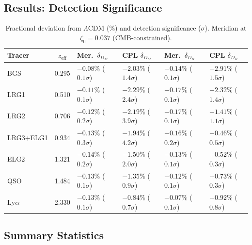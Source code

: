 \subsection{Results: Detection Significance}
\label{sec:2-DESI-sig}

\begin{table}[htbp]
\centering
\caption{Fractional deviation from $\Lambda$CDM (\%) and detection significance ($\sigma$). Meridian at $\zeta_0 = 0.037$ (CMB-constrained).}
\label{tab:2-deviations}
\footnotesize
\begin{tabular}{lcllll}
\toprule
Tracer & $z_\mathrm{eff}$ & Mer.\ $\delta_{D_M}$ & CPL $\delta_{D_M}$ & Mer.\ $\delta_{D_H}$ & CPL $\delta_{D_H}$ \\
\midrule
BGS & 0.295 &
  $-0.08\%$ ($0.1\sigma$) & $-2.03\%$ ($1.4\sigma$) &
  $-0.14\%$ ($0.1\sigma$) & $-2.91\%$ ($1.5\sigma$) \\
LRG1 & 0.510 &
  $-0.11\%$ ($0.1\sigma$) & $-2.29\%$ ($2.4\sigma$) &
  $-0.17\%$ ($0.1\sigma$) & $-2.32\%$ ($1.4\sigma$) \\
LRG2 & 0.706 &
  $-0.12\%$ ($0.2\sigma$) & $-2.19\%$ ($3.9\sigma$) &
  $-0.17\%$ ($0.1\sigma$) & $-1.41\%$ ($1.1\sigma$) \\
LRG3+ELG1 & 0.934 &
  $-0.13\%$ ($0.3\sigma$) & $-1.94\%$ ($4.2\sigma$) &
  $-0.16\%$ ($0.2\sigma$) & $-0.46\%$ ($0.5\sigma$) \\
ELG2 & 1.321 &
  $-0.14\%$ ($0.2\sigma$) & $-1.50\%$ ($2.0\sigma$) &
  $-0.13\%$ ($0.1\sigma$) & $+0.52\%$ ($0.3\sigma$) \\
QSO & 1.484 &
  $-0.13\%$ ($0.1\sigma$) & $-1.35\%$ ($0.9\sigma$) &
  $-0.12\%$ ($0.1\sigma$) & $+0.73\%$ ($0.3\sigma$) \\
Ly$\alpha$ & 2.330 &
  $-0.13\%$ ($0.1\sigma$) & $-0.84\%$ ($0.7\sigma$) &
  $-0.07\%$ ($0.1\sigma$) & $+0.92\%$ ($0.8\sigma$) \\
\bottomrule
\end{tabular}
\end{table}

\subsection{Summary Statistics}
\label{sec:2-DESI-summary}

